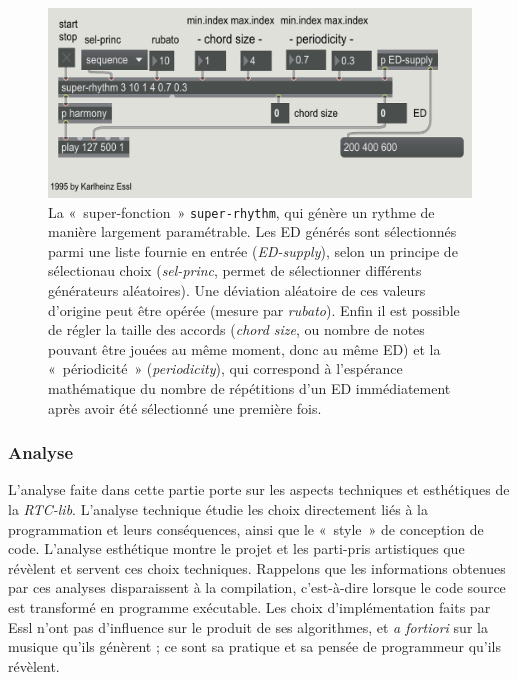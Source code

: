 \documentclass[a4paper,12pt]{article}
\newcommand{\guill}[1]{«~#1~»}
\begin{document}
\begin{figure}[!h]
\begin{center}
\includegraphics[width=\textwidth]{images/superrhythm.png}
\caption{\footnotesize La \guill{super-fonction} \texttt{super-rhythm}, qui génère un rythme de manière largement paramétrable. Les ED générés sont sélectionnés parmi une liste fournie en entrée (\emph{ED-supply}), selon un principe de sélectionau choix (\emph{sel-princ}, permet de sélectionner différents générateurs aléatoires). Une déviation aléatoire de ces valeurs d'origine peut être opérée (mesure par \emph{rubato}). Enfin il est possible de régler la taille des accords (\emph{chord size}, ou nombre de notes pouvant être jouées au même moment, donc au même ED) et la \guill{périodicité} (\emph{periodicity}), qui correspond à l'espérance mathématique du nombre de répétitions d'un ED immédiatement après avoir été sélectionné une première fois.}
\label{superrhythm}
\end{center}
\end{figure}


\subsubsection{Analyse}

L'analyse faite dans cette partie porte sur les aspects techniques et esthétiques de la \emph{RTC-lib}. L'analyse technique étudie les choix directement liés à la programmation et leurs conséquences, ainsi que le \guill{style} de conception de code. L'analyse esthétique montre le projet et les parti-pris artistiques que révèlent et servent ces choix techniques. Rappelons que les informations obtenues par ces analyses disparaissent à la compilation, c'est-à-dire lorsque le code source est transformé en programme exécutable. Les choix d'implémentation faits par Essl n'ont pas d'influence sur le produit de ses algorithmes, et \emph{a fortiori} sur la musique qu'ils génèrent ; ce sont sa pratique et sa pensée de programmeur qu'ils révèlent.
\end{document}
